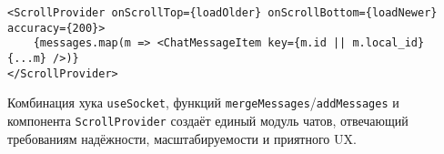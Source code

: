 \begin{lstlisting}[caption={Использование ScrollProvider}, label={lst:ScrollProvider}]
<ScrollProvider onScrollTop={loadOlder} onScrollBottom={loadNewer} accuracy={200}>
    {messages.map(m => <ChatMessageItem key={m.id || m.local_id} {...m} />)}
</ScrollProvider>
\end{lstlisting}

Комбинация хука \texttt{useSocket}, функций \texttt{mergeMessages}/\texttt{addMessages} и компонента \texttt{ScrollProvider} создаёт единый модуль чатов, отвечающий требованиям надёжности, масштабируемости и приятного UX. 

